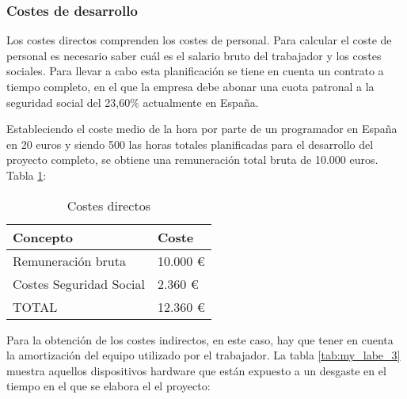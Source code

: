 \documentclass{article}
\begin{document}
\subsubsection{Costes de desarrollo}
Los costes directos comprenden los costes de personal. Para calcular el coste de personal es necesario saber cuál es el salario bruto del trabajador y los costes sociales. Para llevar a cabo esta planificación se tiene en cuenta un contrato a tiempo completo, en el que la empresa debe abonar una cuota patronal a la seguridad social del 23,60\% actualmente en España.

Estableciendo el coste medio de la hora por parte de un programador en España en 20 euros y siendo 500 las horas totales planificadas para el desarrollo del proyecto completo, se obtiene una remuneración total bruta de 10.000 euros. Tabla \ref{tab:my_labe_1}:


\begin{table}[htbp]
\centering
\begin{tabular}{|l|l|}
\hline
Concepto                & Coste    \\ \hline
Remuneración bruta      & 10.000 \euro \\ \hline
Costes Seguridad Social &  2.360 \euro \\ \hline
TOTAL                   & 12.360 \euro \\ \hline
\end{tabular}
 \caption{Costes directos}
    \label{tab:my_labe_1}
\end{table}

Para la obtención de los costes indirectos, en este caso, hay que tener en cuenta la amortización del equipo utilizado por el trabajador.\newline
La tabla \ref{tab:my_labe_3} muestra aquellos dispositivos hardware que están expuesto a un desgaste en el tiempo en el que se elabora el el proyecto:
\end{document}
